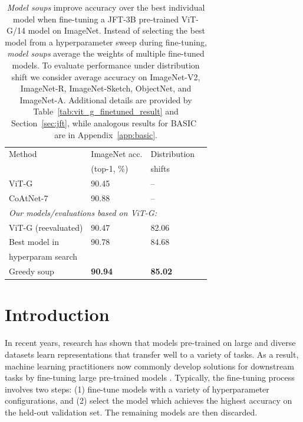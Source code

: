 \documentclass[nohyperref]{article}
\theoremstyle{plain}
\theoremstyle{definition}
\theoremstyle{remark}
\begin{document}
            \begin{table}[h!]
                \footnotesize
                \setlength{\tabcolsep}{5pt}
                \begin{tabular}{ l l l l }
                  \toprule
                  Method & ImageNet acc. & Distribution\\
                  &  (top-1, \%) & shifts\\ 
                  \midrule
                  ViT-G~\cite{zhai2021scaling} & 90.45 & -- \\
                  CoAtNet-7~\cite{dai2021coatnet} & 90.88 & -- \\
                  \midrule
                  \multicolumn{3}{l}{\textit{\color{gray}Our models/evaluations based on ViT-G:}}\\
                  ViT-G (reevaluated) & 90.47 & 82.06 \\
                  Best model in & 90.78 & 84.68 \\
                  hyperparam search &  &  \\
            
                  Greedy soup & \textbf{90.94} & \textbf{85.02} \\
            
                  \bottomrule
                \end{tabular}
                \vspace*{-0.05cm}
                \caption{
                \emph{Model soups} improve accuracy over the best individual model when fine-tuning a JFT-3B pre-trained
                ViT-G/14 model on ImageNet.
                Instead of selecting the best model from a hyperparameter sweep during fine-tuning, \emph{model soups} average the weights of multiple fine-tuned models.
                To evaluate performance under distribution shift we consider average accuracy on ImageNet-V2, ImageNet-R,
                ImageNet-Sketch,
                ObjectNet, and ImageNet-A.
                Additional details are provided
                by Table~\ref{tab:vit_g_finetuned_result} and
                Section~\ref{sec:jft}, while analogous results for BASIC~\cite{pham2021scaling} are in Appendix~\ref{app:basic}.}
                \label{tab:jft}
            \end{table}
            \FloatBarrier
            \section{Introduction} 
            In recent years, research has shown that models pre-trained on large and diverse datasets learn representations that transfer well to a variety of tasks. 
            As a result, machine learning practitioners now commonly develop solutions for downstream tasks by fine-tuning large pre-trained models \cite{girshick2014rich,yosinski2014transferable,kornblith2019better,kolesnikov2020big}. 
            Typically, the fine-tuning process involves two steps:
            (1) fine-tune models with a variety of hyperparameter configurations, and  
            (2) select the model which achieves the highest accuracy on the held-out validation set.
            The remaining models are then discarded.
\end{document}
